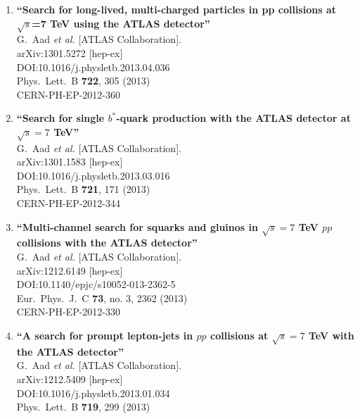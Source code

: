 \documentclass{article}
\begin{document}
\begin{enumerate}
\item%
{\bf ``Search for long-lived, multi-charged particles in pp collisions at $\sqrt{s}$=7 TeV using the ATLAS detector''}
  \\{}G.~Aad {\it et al.} [ATLAS Collaboration].
  \\{}arXiv:1301.5272 [hep-ex]
  \\{}DOI:10.1016/j.physletb.2013.04.036
  \\{}Phys.\ Lett.\ B {\bf 722}, 305 (2013)
  \\{}CERN-PH-EP-2012-360
\item%
{\bf ``Search for single $b^*$-quark production with the ATLAS detector at $\sqrt{s}=7$ TeV''}
  \\{}G.~Aad {\it et al.} [ATLAS Collaboration].
  \\{}arXiv:1301.1583 [hep-ex]
  \\{}DOI:10.1016/j.physletb.2013.03.016
  \\{}Phys.\ Lett.\ B {\bf 721}, 171 (2013)
  \\{}CERN-PH-EP-2012-344
\item%
{\bf ``Multi-channel search for squarks and gluinos in $\sqrt{s}=7$ TeV $pp$ collisions with the ATLAS detector''}
  \\{}G.~Aad {\it et al.} [ATLAS Collaboration].
  \\{}arXiv:1212.6149 [hep-ex]
  \\{}DOI:10.1140/epjc/s10052-013-2362-5
  \\{}Eur.\ Phys.\ J.\ C {\bf 73}, no. 3, 2362 (2013)
  \\{}CERN-PH-EP-2012-330
\item%
{\bf ``A search for prompt lepton-jets in $pp$ collisions at $\sqrt{s}=7$ TeV with the ATLAS detector''}
  \\{}G.~Aad {\it et al.} [ATLAS Collaboration].
  \\{}arXiv:1212.5409 [hep-ex]
  \\{}DOI:10.1016/j.physletb.2013.01.034
  \\{}Phys.\ Lett.\ B {\bf 719}, 299 (2013)

\end{enumerate}
\end{document}
